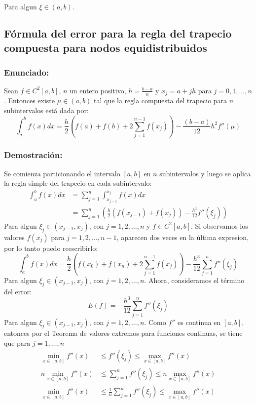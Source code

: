 \documentclass[a4paper,12pt]{article}
\begin{document}
Para algun $\xi \in (a,b)$.

\subsection{Fórmula del error para la regla del trapecio compuesta para nodos equidistribuidos}
\subsubsection{Enunciado:}
Sean $f \in C^2[a,b]$, $n$ un entero positivo, $h=\frac{b-a}{n}$ y $x_j=a+jh$ para $j=0,1,\dots ,n$. Entonces existe $\mu \in (a,b)$ tal que la regla compuesta del trapecio para $n$ subintervalos está dada por:
\[
\int_a^b f(x)dx = \frac{h}{2}\left(f(a)+f(b)+2\sum_{j=1}^{n-1} f(x_j) \right) - \frac{(b-a)}{12}h^2f''(\mu)
\]
\subsubsection{Demostración:}

Se comienza particionando el intervalo $[a,b]$ en $n$ subintervalos y luego se aplica la regla simple del trapecio en cada subintervalo:
\begin{align*}
    \int_a^b f(x)dx &= \sum_{j=1}^{n} \int_{x_{j-1}}^{x_j} f(x)dx \\
    &= \sum_{j=1}^{n} \left(\frac{h}{2}(f(x_{j-1})+f(x_j)) - \frac{h^3}{12}f''(\xi_j)\right) 
\end{align*}
Para algun $\xi_j \in (x_{j-1},x_j)$, con $j=1,2,\dots ,n$ y $f \in C^2[a,b]$. Si observamos los valores $f(x_j)$ para $j=1,2,\dots ,n-1$, aparecen dos veces en la última expresion, por lo tanto puedo reescribirlo:
\[
\int_a^b f(x)dx = \frac{h}{2}\left(f(x_0)+f(x_n)+2\sum_{j=1}^{n-1} f(x_j)\right) - \frac{h^3}{12}\sum_{j=1}^{n}f''(\xi_j)
\]
Para algun $\xi_j \in (x_{j-1},x_j)$, con $j=1,2,\dots ,n$. Ahora, consideramos el término del error:
\[
E(f) = -\frac{h^3}{12}\sum_{j=1}^{n}f''(\xi_j)
\]
Para algun $\xi_j \in (x_{j-1},x_j)$, con $j=1,2,\dots ,n$. Como $f''$ es continua en $[a,b]$, entonces por el Teorema de valores extremos para funciones continuas, se tiene que para $j=1,\dots , n$
\begin{align*}
    \min \limits_{x \in [a,b]} f''(x) &\leq f''(\xi_j) \leq \max \limits_{x \in [a,b]} f''(x) \\
    n \min \limits_{x \in [a,b]} f''(x) &\leq \sum_{j=1}^{n}f''(\xi_j) \leq n \max \limits_{x \in [a,b]} f''(x)\\
    \min \limits_{x \in [a,b]} f''(x) &\leq \frac{1}{n}\sum_{j=1}^{n}f''(\xi_j) \leq \max \limits_{x \in [a,b]} f''(x)
\end{align*}
\end{document}

